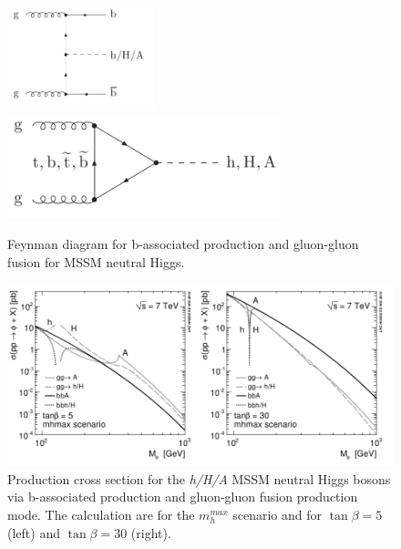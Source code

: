 \begin{figure}[tp]
     \begin{center}

            \includegraphics[height=3cm]{figure/bba.png}
            \includegraphics[height=3cm]{figure/ggf.png}

    \end{center}
    \caption{Feynman diagram for b-associated production and gluon-gluon fusion for MSSM neutral Higgs.}
   \label{fig:prod}
\end{figure}

\begin{figure}[tp]
     \begin{center}

            \includegraphics[width=\textwidth]{figure/xsec.png}

    \end{center}
    \caption{Production cross section for the \emph{h/H/A} MSSM neutral Higgs bosons via b-associated production and
	gluon-gluon fusion production mode. The calculation are for the $m_h^{max}$ scenario and for $\tan \beta=5$ (left) and $\tan \beta=30$ (right).}
   \label{fig:xsec}
\end{figure}
